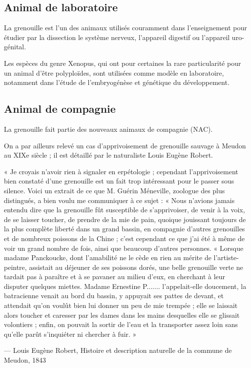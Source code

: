 \subsection{Animal de laboratoire}

La grenouille est l'un des animaux utilisés couramment dans l'enseignement pour étudier par la dissection le système nerveux, l'appareil digestif ou l'appareil uro-génital.

Les espèces du genre Xenopus, qui ont pour certaines la rare particularité pour un animal d'être polyploïdes, sont utilisées comme modèle en laboratoire, notamment dans l'étude de l'embryogénèse et génétique du développement. 

\subsection{Animal de compagnie}

La grenouille fait partie des nouveaux animaux de compagnie (NAC).

On a par ailleurs relevé un cas d'apprivoisement de grenouille sauvage à Meudon au XIXe siècle ; il est détaillé par le naturaliste Louis Eugène Robert.

    « Je croyais n'avoir rien à signaler en erpétologie ; cependant l'apprivoisement bien constaté d'une grenouille est un fait trop intéressant pour le passer sous silence. Voici un extrait de ce que M. Guérin Méneville, zoologue des plus distingués, a bien voulu me communiquer à ce sujet :
    « Nous n'avions jamais entendu dire que la grenouille fût susceptible de s'apprivoiser, de venir à la voix, de se laisser toucher, de prendre de la mie de pain, quoique jouissant toujours de la plus complète liberté dans un grand bassin, en compagnie d'autres grenouilles et de nombreux poissons de la Chine ; c'est cependant ce que j'ai été à même de voir un grand nombre de fois, ainsi que beaucoup d'autres personnes.
    « Lorsque madame Panckoucke, dont l'amabilité ne le cède en rien au mérite de l'artiste-peintre, assistait au déjeuner de ses poissons dorés, une belle grenouille verte ne tardait pas à paraître et à se pavaner au milieu d'eux, en cherchant à leur disputer quelques miettes. Madame Ernestine P....... l'appelait-elle doucement, la batracienne venait au bord du bassin, y appuyait ses pattes de devant, et attendait qu'on voulût bien lui donner un peu de mie trempée ; elle se laissait alors toucher et caresser par les dames dans les mains desquelles elle se glissait volontiers ; enfin, on pouvait la sortir de l'eau et la transporter assez loin sans qu'elle parût s'inquiéter ni chercher à fuir. »

— Louis Eugène Robert, Histoire et description naturelle de la commune de Meudon, 1843

